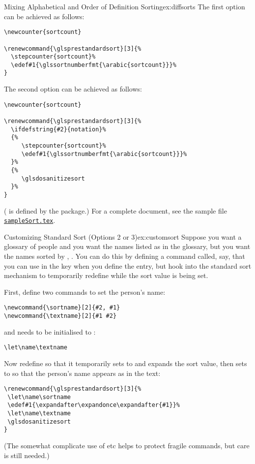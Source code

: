 \documentclass[report,inlinetitle]{nlctdoc}
\newcommand*{\gloskey}[2][newglossaryentry]{\csopt{#1}{#2}}
\newcounter{sample}
\newcommand*{\samplefile}[2][sample]{%
  \hyperref[ex:#1#2]{\texttt{#1#2.tex}}}
\begin{document}
\begin{description}
\begin{example}{Mixing Alphabetical and Order of Definition Sorting}{ex:diffsorts}
The first option can be achieved as follows:
\begin{verbatim}
\newcounter{sortcount}

\renewcommand{\glsprestandardsort}[3]{%
  \stepcounter{sortcount}%
  \edef#1{\glssortnumberfmt{\arabic{sortcount}}}%
}
\end{verbatim}
The second option can be achieved as follows:
\begin{verbatim}
\newcounter{sortcount}

\renewcommand{\glsprestandardsort}[3]{%
  \ifdefstring{#2}{notation}%
  {%
     \stepcounter{sortcount}%
     \edef#1{\glssortnumberfmt{\arabic{sortcount}}}%
  }%
  {%
     \glsdosanitizesort
  }%
}
\end{verbatim}
( is defined by the  package.)
For a complete document, see the sample file \samplefile{Sort}.
\end{example}

\begin{example}{Customizing Standard Sort (Options 2 or 3)}{ex:customsort}
Suppose you want a glossary of people and you want the names listed
as   in the glossary, but you want the names
sorted by , . You can do this by
defining a command called, say,
 that you can use in the
\gloskey{name} key when you define the entry, but hook into the
standard sort mechanism to temporarily redefine  while the
sort value is being set.

First, define two commands to set the person's name:
\begin{verbatim}
\newcommand{\sortname}[2]{#2, #1}
\newcommand{\textname}[2]{#1 #2}
\end{verbatim}
and  needs to be initialised to :
\begin{verbatim}
\let\name\textname
\end{verbatim}
Now redefine  so that it temporarily sets
 to  and expands the sort value, then sets
 to  so that the person's name appears as
  in the text:
\begin{verbatim}
\renewcommand{\glsprestandardsort}[3]{%
 \let\name\sortname
 \edef#1{\expandafter\expandonce\expandafter{#1}}%
 \let\name\textname
 \glsdosanitizesort
}
\end{verbatim}
(The somewhat complicate use of  etc helps to
protect fragile commands, but care is still needed.)


\end{example}
\end{description}
\end{document}
